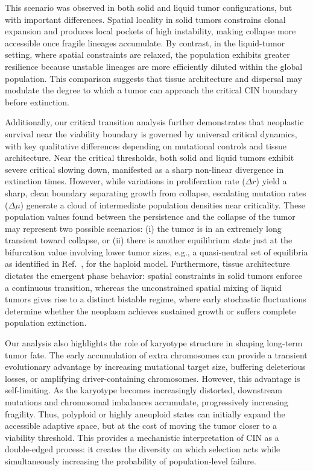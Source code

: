 \documentclass[10pt, aps, rmp,  twocolumn, superscriptaddress, floatfix, showkeys]{revtex4-2}
\begin{document}
This scenario was observed in both solid and liquid tumor configurations, but with important differences. Spatial locality in solid tumors constrains clonal expansion and produces local pockets of high instability, making collapse more accessible once fragile lineages accumulate. By contrast, in the liquid-tumor setting, where spatial constraints are relaxed, the population exhibits greater resilience because unstable lineages are more efficiently diluted within the global population. This comparison suggests that tissue architecture and dispersal may modulate the degree to which a tumor can approach the critical CIN boundary before extinction.

Additionally, our critical transition analysis further demonstrates that neoplastic survival near the viability boundary is governed by universal critical dynamics, with key qualitative differences depending on mutational controls and tissue architecture. Near the critical thresholds, both solid and liquid tumors exhibit severe critical slowing down, manifested as a sharp non-linear divergence in extinction times. However, while variations in proliferation rate ($\Delta r$) yield a sharp, clean boundary separating growth from collapse, escalating mutation rates ($\Delta \mu$) generate a cloud of intermediate population densities near criticality. These population values found between the persistence and the collapse of the tumor may represent two possible scenarios: (i) the tumor is in an extremely long transient toward collapse, or (ii) there is another equilibrium state just at the bifurcation value involving lower tumor sizes, e.g., a quasi-neutral set of equilibria as identified in Ref.~\cite{Sardanyes2017JMB,Sardanyes2018RSOS, Sardanyes2018SciRep}, for the haploid model. Furthermore, tissue architecture dictates the emergent phase behavior: spatial constraints in solid tumors enforce a continuous transition, whereas the unconstrained spatial mixing of liquid tumors gives rise to a distinct bistable regime, where early stochastic fluctuations determine whether the neoplasm achieves sustained growth or suffers complete population extinction.

Our analysis also highlights the role of karyotype structure in 
shaping long-term tumor fate. The early accumulation of extra 
chromosomes can provide a transient evolutionary advantage by 
increasing mutational target size, buffering deleterious losses, or 
amplifying driver-containing chromosomes. However, this advantage is 
self-limiting. As the karyotype becomes increasingly distorted, 
downstream mutations and chromosomal imbalances accumulate, 
progressively increasing fragility. Thus, polyploid or highly 
aneuploid states can initially expand the accessible adaptive space, 
but at the cost of moving the tumor closer to a viability threshold.
This provides a mechanistic interpretation of CIN as a double-edged 
process: it creates the diversity on which selection acts while 
simultaneously increasing the probability of population-level 
failure.
\end{document}
